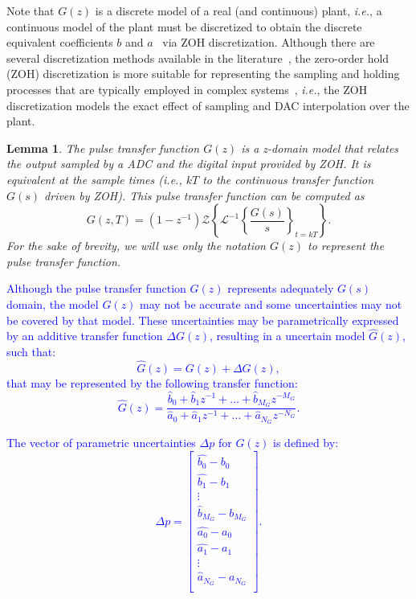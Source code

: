 \documentclass{sig-alternate-05-2015}
\newtheorem{mylemma}{Lemma}
\begin{document}
Note that $G(z)$ is a discrete model of a real (and continuous) plant, {\it
i.e.}, a continuous model of the plant must be discretized to obtain the
discrete equivalent coefficients $b$ and $a$~\cite{Astrom08} via ZOH
discretization.  Although there are several discretization methods available
in the literature~\cite{Franklin15}, the zero-order hold (ZOH)
discretization is more suitable for representing the sampling and holding
processes that are typically employed in complex systems~\cite{istepanian2012digital}, {\it i.e.}, the ZOH discretization
models the exact effect of sampling and DAC interpolation over the plant.

\begin{mylemma}\cite{astrom1997computer}
%
The pulse transfer function $G(z)$ is a z-domain model that relates the
output sampled by a ADC and the digital input provided by ZOH.  It is
equivalent at the sample times ({\it i.e.}, $kT$ to the continuous transfer
function $G(s)$ driven by ZOH).  This pulse transfer function can be
computed as
%
\begin{equation}
\label{eq:pulsetf}
G(z,T) = (1-z^{-1})\mathcal{Z}\left\lbrace{\mathcal{L}^{-1}\left\lbrace{\frac{G(s)}{s}}\right\rbrace_{t=kT}}\right\rbrace.
\end{equation}
%
For the sake of brevity, 
we will use only the notation $G(z)$ to represent the pulse transfer function.
%
\end{mylemma}


\textcolor{blue}{
Although the pulse transfer function $G(z)$ represents adequately $G(s)$ domain, the model $G(z)$ may not be accurate and some uncertainties may not be covered by that model. These uncertainties may be parametrically expressed by an additive transfer function $\Delta G(z)$, resulting in a uncertain model $\hat{G}(z)$, such that:
\begin{equation}
\hat{G}(z)=G(z)+\Delta G(z),
\end{equation}
that may be represented by the following transfer function:
\begin{equation}
\hat{G}(z)=\frac{\hat{b}_{0}+\hat{b}_{1}z^{-1}+...+\hat{b}_{M_G}z^{-M_G}}{\hat{a}_{0}+\hat{a}_{1}z^{-1}+...+\hat{a}_{N_G}z^{-N_G}}.
\end{equation}}

\textcolor{blue}{
The vector of parametric uncertainties  $\Delta{p}$ for $G(z)$ is defined by:
\begin{equation}
\Delta{p}=\begin{bmatrix}
\hat{b_{0}} - b_{0}\\
\hat{b_{1}} - b_{1}\\
\vdots \\
\hat{b}_{M_G} - b_{M_{G}}\\
\hat{a_{0}} - a_{0}\\
\hat{a_{1}} - a_{1}\\
\vdots\\
\hat{a}_{N_G} - a_{N_{G}}\\
\end{bmatrix}.
\end{equation}}
\end{document}
